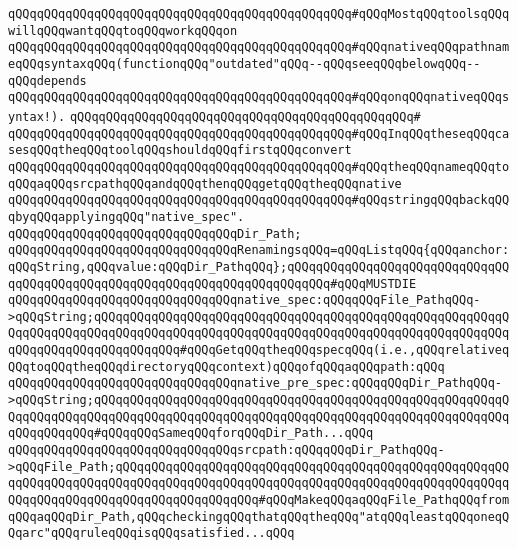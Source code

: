 \verb|qQQqqQQqqQQqqQQqqQQqqQQqqQQqqQQqqQQqqQQqqQQqqQQq#qQQqMostqQQqtoolsqQQqwillqQQqwantqQQqtoqQQqworkqQQqon|\newline
\verb|qQQqqQQqqQQqqQQqqQQqqQQqqQQqqQQqqQQqqQQqqQQqqQQq#qQQqnativeqQQqpathnameqQQqsyntaxqQQq(functionqQQq"outdated"qQQq--qQQqseeqQQqbelowqQQq--qQQqdepends|\newline
\verb|qQQqqQQqqQQqqQQqqQQqqQQqqQQqqQQqqQQqqQQqqQQqqQQq#qQQqonqQQqnativeqQQqsyntax!).|\newline
\verb|qQQqqQQqqQQqqQQqqQQqqQQqqQQqqQQqqQQqqQQqqQQqqQQq#|\newline
\verb|qQQqqQQqqQQqqQQqqQQqqQQqqQQqqQQqqQQqqQQqqQQqqQQq#qQQqInqQQqtheseqQQqcasesqQQqtheqQQqtoolqQQqshouldqQQqfirstqQQqconvert|\newline
\verb|qQQqqQQqqQQqqQQqqQQqqQQqqQQqqQQqqQQqqQQqqQQqqQQq#qQQqtheqQQqnameqQQqtoqQQqaqQQqsrcpathqQQqandqQQqthenqQQqgetqQQqtheqQQqnative|\newline
\verb|qQQqqQQqqQQqqQQqqQQqqQQqqQQqqQQqqQQqqQQqqQQqqQQq#qQQqstringqQQqbackqQQqbyqQQqapplyingqQQq"native_spec".|\newline
\newline
\verb|qQQqqQQqqQQqqQQqqQQqqQQqqQQqqQQqDir_Path;|\newline
\newline
\verb|qQQqqQQqqQQqqQQqqQQqqQQqqQQqqQQqRenamingsqQQq=qQQqListqQQq{qQQqanchor:qQQqString,qQQqvalue:qQQqDir_PathqQQq};qQQqqQQqqQQqqQQqqQQqqQQqqQQqqQQqqQQqqQQqqQQqqQQqqQQqqQQqqQQqqQQqqQQqqQQqqQQq#qQQqMUSTDIE|\newline
\newline
\verb|qQQqqQQqqQQqqQQqqQQqqQQqqQQqqQQqnative_spec:qQQqqQQqFile_PathqQQq->qQQqString;qQQqqQQqqQQqqQQqqQQqqQQqqQQqqQQqqQQqqQQqqQQqqQQqqQQqqQQqqQQqqQQqqQQqqQQqqQQqqQQqqQQqqQQqqQQqqQQqqQQqqQQqqQQqqQQqqQQqqQQqqQQqqQQqqQQqqQQqqQQqqQQqqQQqqQQq#qQQqGetqQQqtheqQQqspecqQQq(i.e.,qQQqrelativeqQQqtoqQQqtheqQQqdirectoryqQQqcontext)qQQqofqQQqaqQQqpath:qQQq|\newline
\newline
\verb|qQQqqQQqqQQqqQQqqQQqqQQqqQQqqQQqnative_pre_spec:qQQqqQQqDir_PathqQQq->qQQqString;qQQqqQQqqQQqqQQqqQQqqQQqqQQqqQQqqQQqqQQqqQQqqQQqqQQqqQQqqQQqqQQqqQQqqQQqqQQqqQQqqQQqqQQqqQQqqQQqqQQqqQQqqQQqqQQqqQQqqQQqqQQqqQQqqQQqqQQqqQQq#qQQqqQQqSameqQQqforqQQqDir_Path...qQQq|\newline
\newline
\verb|qQQqqQQqqQQqqQQqqQQqqQQqqQQqqQQqsrcpath:qQQqqQQqDir_PathqQQq->qQQqFile_Path;qQQqqQQqqQQqqQQqqQQqqQQqqQQqqQQqqQQqqQQqqQQqqQQqqQQqqQQqqQQqqQQqqQQqqQQqqQQqqQQqqQQqqQQqqQQqqQQqqQQqqQQqqQQqqQQqqQQqqQQqqQQqqQQqqQQqqQQqqQQqqQQqqQQqqQQqqQQqqQQq#qQQqMakeqQQqaqQQqFile_PathqQQqfromqQQqaqQQqDir_Path,qQQqcheckingqQQqthatqQQqtheqQQq"atqQQqleastqQQqoneqQQqarc"qQQqruleqQQqisqQQqsatisfied...qQQq|\newline
